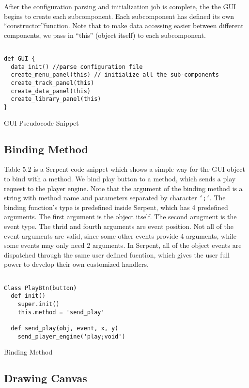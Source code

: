 After the configuration parsing and initialization job is complete, the 
the GUI begins to create each subcomponent. Each subcomponent has defined its 
own ``constructor''function. Note that to make data accessing easier 
between different components, we pass in ``this'' (object itself) to each  
subcomponent.
\begin{table}[htdp]
\centering
\begin{lstlisting}

def GUI {
  data_init() //parse configuration file
  create_menu_panel(this) // initialize all the sub-components
  create_track_panel(this)
  create_data_panel(this)
  create_library_panel(this)
}

\end{lstlisting}
\caption[GUI Pseudocode Snippet]{GUI Pseudocode Snippet}
\end{table}

\subsection{Binding Method}
Table 5.2 is a Serpent code snippet which shows a simple way for the GUI object 
to bind with a method. We bind play button to a method, which sends a play 
request to the player engine. Note that the argument of the binding method is 
a string with method name and parameters
separated by character \texttt{`;'}. The binding function's type is predefined 
inside Serpent, which has 4 predefined arguments. The first argument is the object 
itself. The second arugment is the event type. The thrid and fourth arguments are 
event position.
Not all of the event arguments are valid, since some other events provide 4 arguments, 
while some events may only need 2 arguments. In Serpent, all of the object events 
are dispatched through the same user defined fucntion, which gives the user full 
power to develop their own customized handlers.

\begin{table}[htdp]
\centering
\begin{lstlisting}

Class PlayBtn(button)
  def init()
    super.init()
    this.method = 'send_play'

  def send_play(obj, event, x, y)
    send_player_engine('play;void')

\end{lstlisting}
\caption[Binding Method]{Binding Method}
\end{table}

\subsection{Drawing Canvas}
 
